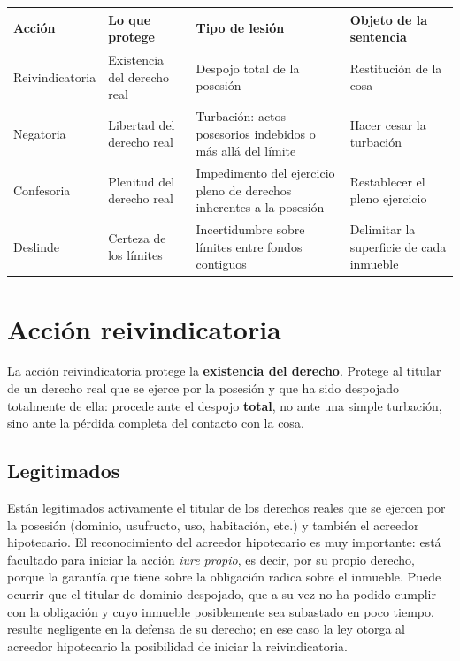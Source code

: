 \documentclass[12pt,oneside]{book}
\begin{document}
\begin{table}[H]
\centering
\small
\begin{tabularx}{\textwidth}{@{}>{\raggedright\arraybackslash}p{}>{\raggedright\arraybackslash}X>{\raggedright\arraybackslash}X>{\raggedright\arraybackslash}X@{}}
\toprule
\textbf{Acción} & \textbf{Lo que protege} & \textbf{Tipo de lesión} & \textbf{Objeto de la sentencia} \\
\midrule
Reivindicatoria & Existencia del derecho real & Despojo total de la posesión & Restitución de la cosa \\
Negatoria & Libertad del derecho real & Turbación: actos posesorios indebidos o más allá del límite & Hacer cesar la turbación \\
Confesoria & Plenitud del derecho real & Impedimento del ejercicio pleno de derechos inherentes a la posesión & Restablecer el pleno ejercicio \\
Deslinde & Certeza de los límites & Incertidumbre sobre límites entre fondos contiguos & Delimitar la superficie de cada inmueble \\
\bottomrule
\end{tabularx}
\end{table}

\section{Acción reivindicatoria}

La acción reivindicatoria protege la \textbf{existencia del derecho}. Protege al titular de un derecho real que se ejerce por la posesión y que ha sido despojado totalmente de ella: procede ante el despojo \textbf{total}, no ante una simple turbación, sino ante la pérdida completa del contacto con la cosa.

\subsection{Legitimados}

Están legitimados activamente el titular de los derechos reales que se ejercen por la posesión (dominio, usufructo, uso, habitación, etc.) y también el acreedor hipotecario. El reconocimiento del acreedor hipotecario es muy importante: está facultado para iniciar la acción \textit{iure propio}, es decir, por su propio derecho, porque la garantía que tiene sobre la obligación radica sobre el inmueble. Puede ocurrir que el titular de dominio despojado, que a su vez no ha podido cumplir con la obligación y cuyo inmueble posiblemente sea subastado en poco tiempo, resulte negligente en la defensa de su derecho; en ese caso la ley otorga al acreedor hipotecario la posibilidad de iniciar la reivindicatoria.
\end{document}
